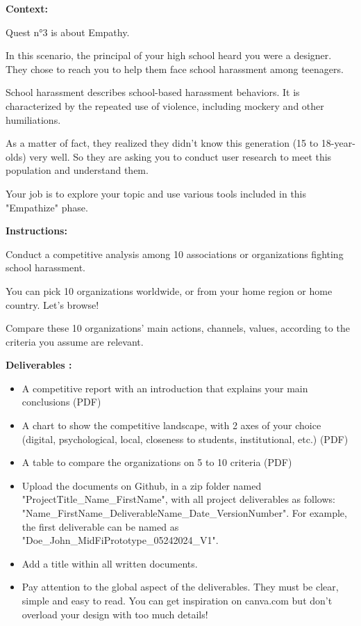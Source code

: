 \makeheaderfiles

\textbf{Context:}

Quest n°3 is about Empathy.

In this scenario, the principal of your high school heard you were a designer. They chose to reach you to help them face school harassment among teenagers.

School harassment describes school-based harassment behaviors. It is characterized by the repeated use of violence, including mockery and other humiliations.

As a matter of fact, they realized they didn't know this generation (15 to 18-year-olds) very well. So they are asking you to conduct user research to meet this population and understand them.

Your job is to explore your topic and use various tools included in this "Empathize" phase.

\textbf{Instructions:}

Conduct a competitive analysis among 10 associations or organizations fighting school harassment.

You can pick 10 organizations worldwide, or from your home region or home country. Let's browse!

Compare these 10 organizations' main actions, channels, values, according to the criteria you assume are relevant.

\textbf{Deliverables :}

\begin{itemize}
\item A competitive report with an introduction that explains your main conclusions (PDF)
\item A chart to show the competitive landscape, with 2 axes of your choice (digital, psychological, local, closeness to students, institutional, etc.) (PDF)
\item A table to compare the organizations on 5 to 10 criteria (PDF)
\item Upload the documents on Github, in a zip folder named "ProjectTitle\_Name\_FirstName", with all project deliverables as follows: "Name\_FirstName\_DeliverableName\_Date\_VersionNumber".  For example, the first deliverable can be named as "Doe\_John\_MidFiPrototype\_05242024\_V1".
\item Add a title within all written documents.
\item Pay attention to the global aspect of the deliverables. They must be clear, simple and easy to read. You can get inspiration on canva.com but don't overload your design with too much details!
\end{itemize}

